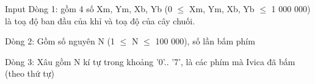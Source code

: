 Input  
Dòng 1: gồm 4 số Xm, Ym, Xb, Yb (0 $\le$  Xm, Ym, Xb, Yb $\le$ 1 000 000) là toạ độ ban đầu của khỉ và toạ độ của cây chuối.  

   Dòng 2: Gồm số nguyên N (1 $\le$ N $\le$ 100 000), số lần bấm phím  

   Dòng 3: Xâu gồm N kí tự trong khoảng '0'.. '7', là các phím mà Ivica đã bấm (theo thứ tự)